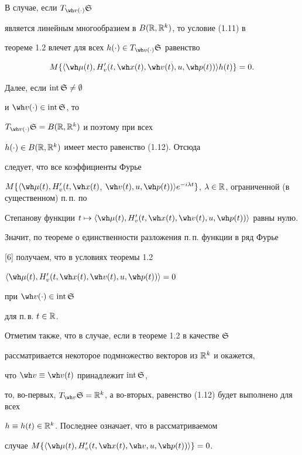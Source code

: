 \begin{notes}


В случае, если $T_{\wh v(\cdot)}\gS$


является линейным многообразием в $B(\Bbb R,\Bbb R^{k})$, то условие (1.11) в


теореме 1.2 влечет для всех $h(\cdot)\in T_{\wh v(\cdot)}\gS$ равенство


\begin{equation}


M\{\la\wh\mu(t),H'_{v}(t,\wh x(t),\wh v(t),u,\wh p(t))\ra h(t)\}=0.


\end{equation}


Далее, если $\mathrm{int}\,\frak S\ne\emptyset$


и $\wh v(\cdot)\in \mathrm{int}\,\gS$, то


$T_{\wh v(\cdot)}\gS=B(\R,\R^{k})$ и поэтому при всех


$h(\cdot)\in B(\Bbb R,\Bbb R^{k})$ имеет место равенство (1.12). Отсюда


следует, что все коэффициенты Фурье


$M\{\la\wh\mu(t),H'_{v}(t,\wh x(t)$, $\wh v(t),u,\wh p(t))\ra




e^{-i\lambda t}\}$, $\lambda\in\R$, ограниченной (в существенном) п.\,п. по


Степанову функции $t\mapsto


\la\wh\mu(t),H'_{v}(t,\wh x(t),\wh v(t),u,\wh p(t))\ra$ равны нулю.


Значит, по теореме о единственности разложения п.\,п. функции в ряд Фурье


[6] получаем, что в условиях теоремы 1.2


$\la\wh\mu(t),H'_{v}(t,\wh x(t),\wh v(t),u,\wh p(t))\ra=0$


при $\wh v(\cdot)\in \mathrm{int}\,\gS$


для п.\,в. $t\in\Bbb R$.


Отметим также, что в случае, если в теореме 1.2 в качестве $\frak S$


рассматривается некоторое подмножество векторов из $\Bbb R^{k}$ и окажется,


что $\wh v\equiv\wh v(t)$ принадлежит $\mathrm{int}\,\frak S$,


то, во-первых, $T_{\wh


v}\gS=\R^{k}$, а во-вторых, равенство (1.12) будет выполнено для всех


$h\equiv h(t)\in\Bbb R^{k}$. Последнее означает, что в рассматриваемом


случае $M\{\la\wh\mu(t),H'_{v}(t,\wh x(t),\wh v,u,\wh p(t))\ra\}=0$.


\end{notes}





